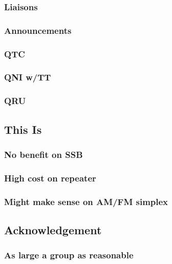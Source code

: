 \documentclass[11pt]{article}
\begin{document}
\subsubsection{Liaisons}
\label{sec-2.1.2}

\subsubsection{Announcements}
\label{sec-2.1.3}

\subsubsection{QTC}
\label{sec-2.1.4}

\subsubsection{QNI w/TT}
\label{sec-2.1.5}

\subsubsection{QRU}
\label{sec-2.1.6}

\subsection{This Is}
\label{sec-2.2}

\subsubsection{No benefit on SSB}
\label{sec-2.2.1}

\subsubsection{High cost on repeater}
\label{sec-2.2.2}

\subsubsection{Might make sense on AM/FM simplex}
\label{sec-2.2.3}

\subsection{Acknowledgement}
\label{sec-2.3}

\subsubsection{As large a group as reasonable}
\label{sec-2.3.1}
\end{document}
